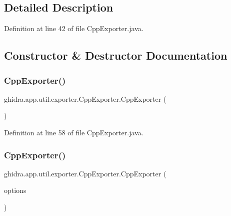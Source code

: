 \subsection{Detailed Description}


Definition at line 42 of file Cpp\+Exporter.\+java.



\subsection{Constructor \& Destructor Documentation}
\mbox{\label{classghidra_1_1app_1_1util_1_1exporter_1_1_cpp_exporter_aa70134a36c4702c4ca2aa739d4ecb069}} 
\subsubsection{\texorpdfstring{CppExporter()}{CppExporter()}\hspace{0.1cm}{\footnotesize\ttfamily [1/2]}}
{\footnotesize\ttfamily ghidra.\+app.\+util.\+exporter.\+Cpp\+Exporter.\+Cpp\+Exporter (\begin{DoxyParamCaption}{ }\end{DoxyParamCaption})\hspace{0.3cm}{\ttfamily [inline]}}



Definition at line 58 of file Cpp\+Exporter.\+java.

\mbox{\label{classghidra_1_1app_1_1util_1_1exporter_1_1_cpp_exporter_aa63fe1218bd22aff8442f82177316242}} 
\subsubsection{\texorpdfstring{CppExporter()}{CppExporter()}\hspace{0.1cm}{\footnotesize\ttfamily [2/2]}}
{\footnotesize\ttfamily ghidra.\+app.\+util.\+exporter.\+Cpp\+Exporter.\+Cpp\+Exporter (\begin{DoxyParamCaption}\item[{\mbox{\hyperlink{classghidra_1_1app_1_1decompiler_1_1_decompile_options}{Decompile\+Options}}}]{options }\end{DoxyParamCaption})\hspace{0.3cm}{\ttfamily [inline]}}



